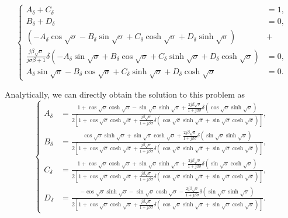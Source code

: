 \documentclass{article}
\begin{document}
\begin{equation}
    \left\{\begin{aligned}
        A_\delta + C_\delta &= 1, \\
        B_\delta + D_\delta &= 0, \\
        \left( - A_\delta \cos{\sqrt{\sigma}} - B_\delta \sin{\sqrt{\sigma}} + C_\delta \cosh{\sqrt{\sigma}} + D_\delta \sinh{\sqrt{\sigma}} \right) &+ \\
        \frac{j \beta \sqrt{\sigma}}{ j\sigma \beta + 1 } \delta \left( - A_\delta \sin{\sqrt{\sigma}} + B_\delta \cos{\sqrt{\sigma}} + C_\delta \sinh{\sqrt{\sigma}} + D_\delta \cosh{\sqrt{\sigma}} \right) &= 0, \\
        A_\delta \sin{\sqrt{\sigma}} - B_\delta \cos{\sqrt{\sigma}} + C_\delta \sinh{\sqrt{\sigma}} + D_\delta \cosh{\sqrt{\sigma}} &= 0.
    \end{aligned}\right.
\end{equation}


Analytically, we can directly obtain the solution to this problem as 
\begin{equation}
    \left\{\begin{aligned}
        A_\delta &= \frac{ 1 + \cos\sqrt{\sigma } \cosh\sqrt{\sigma } - \sin\sqrt{\sigma } \sinh\sqrt{\sigma} + \frac{2 j \beta \sqrt{\sigma}}{ 1+ j \beta \sigma } \delta \left( \cos\sqrt{\sigma } \sinh\sqrt{\sigma } \right)}{2 \left[ 1 + \cos\sqrt{\sigma } \cosh\sqrt{\sigma } + \frac{j \beta \sqrt{\sigma}}{ 1+ j \beta \sigma } \delta \left( \cos\sqrt{\sigma } \sinh\sqrt{\sigma } + \sin\sqrt{\sigma } \cosh\sqrt{\sigma } \right) \right]}, \\
        B_\delta &= \frac{ \cos\sqrt{\sigma } \sinh\sqrt{\sigma } + \sin\sqrt{\sigma } \cosh\sqrt{\sigma} + \frac{2 j \beta \sqrt{\sigma}}{ 1+ j \beta \sigma } \delta \left( \sin\sqrt{\sigma } \sinh\sqrt{\sigma } \right)}{2 \left[ 1 + \cos\sqrt{\sigma } \cosh\sqrt{\sigma } + \frac{j \beta \sqrt{\sigma}}{ 1+ j \beta \sigma } \delta \left( \cos\sqrt{\sigma } \sinh\sqrt{\sigma } + \sin\sqrt{\sigma } \cosh\sqrt{\sigma } \right) \right]}, \\
        C_\delta &= \frac{ 1 + \cos\sqrt{\sigma } \cosh\sqrt{\sigma } + \sin\sqrt{\sigma } \sinh\sqrt{\sigma} + \frac{2 j \beta \sqrt{\sigma}}{ 1+ j \beta \sigma } \delta \left( \sin\sqrt{\sigma } \cosh\sqrt{\sigma } \right)}{2 \left[ 1 + \cos\sqrt{\sigma } \cosh\sqrt{\sigma } + \frac{j \beta \sqrt{\sigma}}{ 1+ j \beta \sigma } \delta \left( \cos\sqrt{\sigma } \sinh\sqrt{\sigma } + \sin\sqrt{\sigma } \cosh\sqrt{\sigma } \right) \right]}, \\
        D_\delta &= \frac{ -\cos\sqrt{\sigma } \sinh\sqrt{\sigma } - \sin\sqrt{\sigma } \cosh\sqrt{\sigma} -  \frac{2 j \beta \sqrt{\sigma}}{ 1+ j \beta \sigma } \delta \left( \sin\sqrt{\sigma } \sinh\sqrt{\sigma } \right)}{2 \left[ 1 + \cos\sqrt{\sigma } \cosh\sqrt{\sigma } + \frac{j \beta \sqrt{\sigma}}{ 1+ j \beta \sigma } \delta \left( \cos\sqrt{\sigma } \sinh\sqrt{\sigma } + \sin\sqrt{\sigma } \cosh\sqrt{\sigma } \right) \right]}.
    \end{aligned}\right.
\end{equation}
\end{document}
